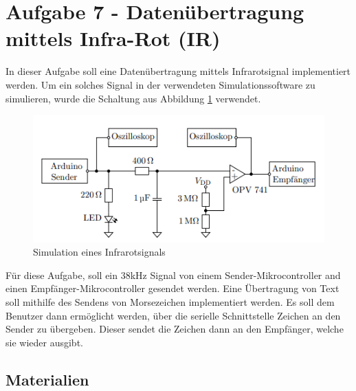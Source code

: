 \section{Aufgabe 7 - Datenübertragung mittels Infra-Rot (IR)}
\label{sec:aufgabe-7---datenuebertragung-mittels-infra-rot-ir}

In dieser Aufgabe soll eine Datenübertragung mittels Infrarotsignal implementiert werden.
Um ein solches Signal in der verwendeten Simulationssoftware zu simulieren, wurde die Schaltung aus Abbildung \ref{fig:a7-simulation-infrarot} verwendet.

\begin{figure}[h]
    \centering
    \includegraphics{pictures/a7-addon.png}
    \caption{Simulation eines Infrarotsignals}
    \label{fig:a7-simulation-infrarot}
\end{figure}

Für diese Aufgabe, soll ein 38kHz Signal von einem Sender-Mikrocontroller and einen Empfänger-Mikrocontroller gesendet werden.
Eine Übertragung von Text soll mithilfe des Sendens von Morsezeichen implementiert werden.
Es soll dem Benutzer dann ermöglicht werden, über die serielle Schnittstelle Zeichen an den Sender zu übergeben.
Dieser sendet die Zeichen dann an den Empfänger, welche sie wieder ausgibt.

\newpage

\subsection{Materialien}
\label{subsec:a7-materialien}

